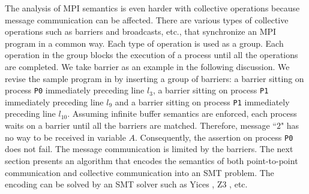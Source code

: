 
The analysis of MPI semantics is even harder with collective operations because message communication can be affected. There are various types of collective operations such as barriers and broadcasts, etc., that synchronize an MPI program in a common way. Each type of operation is used as a group. Each operation in the group blocks the execution of a process until all the operations are completed. We take barrier as an example in the following discussion. We revise the sample program in  by inserting a group of barriers: a barrier sitting on process \texttt{P0} immediately preceding line $l_3$, a barrier sitting on process \texttt{P1} immediately preceding line $l_9$ and a barrier sitting on process \texttt{P1} immediately preceding line $l_{10}$. Assuming infinite buffer semantics are enforced, each process waits on a barrier until all the barriers are matched. Therefore, message ``$2$" has no way to be received in variable $A$. Consequently, the assertion on process \texttt{P0} does not fail. The message communication is limited by the barriers. The next section presents an algorithm that encodes the semantics of both point-to-point communication and collective communication into an SMT problem. The encoding can be solved by an SMT solver such as Yices \cite{dutertre:CAV06}, Z3 \cite{demoura:tacas08}, etc.





